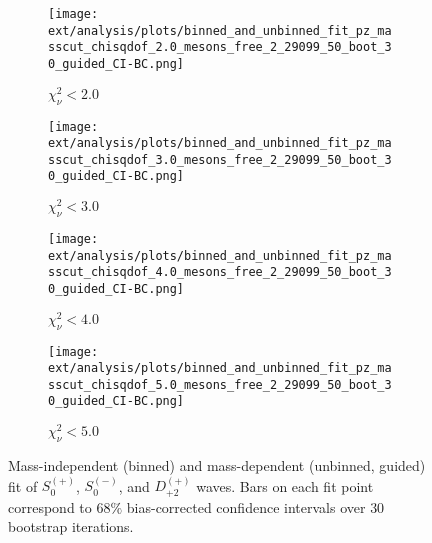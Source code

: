 \begin{figure}[htbp]
    \centering
    \begin{subfigure}{0.45\textwidth}
        \texttt{[image: ext/analysis/plots/binned\_and\_unbinned\_fit\_pz\_masscut\_chisqdof\_2.0\_mesons\_free\_2\_29099\_50\_boot\_30\_guided\_CI-BC.png]}
        \caption{$\chi^2_\nu < 2.0$}
    \end{subfigure}
    \hfill
    \begin{subfigure}{0.45\textwidth}
        \texttt{[image: ext/analysis/plots/binned\_and\_unbinned\_fit\_pz\_masscut\_chisqdof\_3.0\_mesons\_free\_2\_29099\_50\_boot\_30\_guided\_CI-BC.png]}
        \caption{$\chi^2_\nu < 3.0$}
    \end{subfigure}
    \vspace{1em}
    \begin{subfigure}{0.45\textwidth}
        \texttt{[image: ext/analysis/plots/binned\_and\_unbinned\_fit\_pz\_masscut\_chisqdof\_4.0\_mesons\_free\_2\_29099\_50\_boot\_30\_guided\_CI-BC.png]}
        \caption{$\chi^2_\nu < 4.0$}
    \end{subfigure}
    \hfill
    \begin{subfigure}{0.45\textwidth}
        \texttt{[image: ext/analysis/plots/binned\_and\_unbinned\_fit\_pz\_masscut\_chisqdof\_5.0\_mesons\_free\_2\_29099\_50\_boot\_30\_guided\_CI-BC.png]}
        \caption{$\chi^2_\nu < 5.0$}
    \end{subfigure}

    \caption{Mass-independent (binned) and mass-dependent (unbinned, guided) fit of $S_{0}^{(+)}$, $S_{0}^{(-)}$, and $D_{+2}^{(+)}$ waves. Bars on each fit point correspond to $68\%$ bias-corrected confidence intervals over $ 30 $ bootstrap iterations.}
    \label{fig:unbinned-guided-fit-all-Spn-D2p}
\end{figure}

